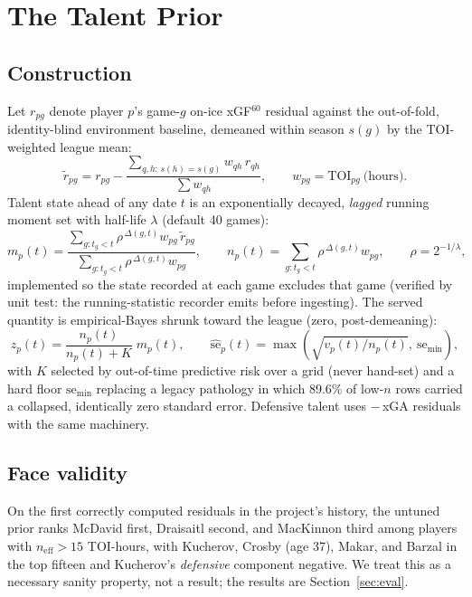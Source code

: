 \documentclass[11pt]{article}
\begin{document}
\section{The Talent Prior}\label{sec:talent}

\subsection{Construction}

Let $r_{pg}$ denote player $p$'s game-$g$ on-ice xGF$^{60}$ residual against the
out-of-fold, identity-blind environment baseline, demeaned within season $s(g)$ by the
TOI-weighted league mean:
\begin{equation}
\tilde r_{pg} = r_{pg} - \frac{\sum_{q,h:\, s(h)=s(g)} w_{qh}\, r_{qh}}{\sum w_{qh}},
\qquad w_{pg} = \text{TOI}_{pg}\ \text{(hours)} .
\end{equation}
Talent state ahead of any date $t$ is an exponentially decayed, \emph{lagged} running
moment set with half-life $\lambda$ (default 40 games):
\begin{equation}
m_p(t) = \frac{\sum_{g: t_g < t} \rho^{\,\Delta(g,t)} w_{pg}\, \tilde r_{pg}}
              {\sum_{g: t_g < t} \rho^{\,\Delta(g,t)} w_{pg}},
\qquad
n_p(t) = \sum_{g: t_g < t} \rho^{\,\Delta(g,t)} w_{pg},
\qquad \rho = 2^{-1/\lambda},
\end{equation}
implemented so the state recorded at each game excludes that game (verified by unit test:
the running-statistic recorder emits before ingesting). The served quantity is
empirical-Bayes shrunk toward the league (zero, post-demeaning):
\begin{equation}
z_p(t) = \frac{n_p(t)}{n_p(t) + K}\; m_p(t),
\qquad
\widehat{\mathrm{se}}_p(t) = \max\!\left(\sqrt{v_p(t)/n_p(t)},\ \mathrm{se}_{\min}\right),
\label{eq:shrink}
\end{equation}
with $K$ selected by out-of-time predictive risk over a grid (never hand-set) and a hard
floor $\mathrm{se}_{\min}$ replacing a legacy pathology in which 89.6\% of low-$n$ rows
carried a collapsed, identically zero standard error. Defensive talent uses $-\,$xGA
residuals with the same machinery.

\subsection{Face validity}

On the first correctly computed residuals in the project's history, the untuned prior ranks
McDavid first, Draisaitl second, and MacKinnon third among players with
$n_{\mathrm{eff}} > 15$ TOI-hours, with Kucherov, Crosby (age 37), Makar, and Barzal in the
top fifteen and Kucherov's \emph{defensive} component negative. We treat this as a
necessary sanity property, not a result; the results are Section~\ref{sec:eval}.
\end{document}
